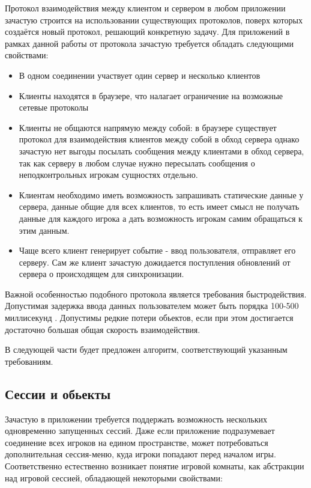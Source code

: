 \documentclass[a4paper,14pt, openany]{book}
\begin{document}
Протокол взаимодействия между клиентом и сервером в любом приложении зачастую строится на использовании существующих протоколов, поверх которых создаётся новый протокол, решающий конкретную задачу. Для приложений в рамках данной работы от протокола зачастую требуется обладать следующими свойствами:

\begin{itemize}
  \item В одном соединении участвует один сервер и несколько клиентов
  \item Клиенты находятся в браузере, что налагает ограничение на возможные сетевые протоколы
  \item Клиенты не общаются напрямую между собой: в браузере существует протокол для взаимодействия клиентов между собой в обход сервера \cite{webrtc} однако зачастую нет выгоды посылать сообщения между клиентами в обход сервера, так как серверу в любом случае нужно пересылать сообщения о неподконтрольных игрокам сущностях отдельно.
  \item Клиентам необходимо иметь возможность запрашивать статические данные у сервера, данные общие для всех клиентов, то есть имеет смысл не получать данные для каждого игрока а дать возможность игрокам самим обращаться к этим данным.
  \item Чаще всего клиент генерирует событие - ввод пользователя, отправляет его серверу. Сам же клиент зачастую дожидается поступления обновлений от сервера о происходящем для синхронизации.
\end{itemize}

Важной особенностью подобного протокола является требования быстродействия. Допустимая задержка ввода данных пользователем может быть порядка 100-500 миллисекунд \cite{latencyArticle}. Допустимы редкие потери обьектов, если при этом достигается достаточно большая общая скорость взаимодействия.

В следующей части будет предложен алгоритм, соответствующий указанным требованиям. 

\subsection{Сессии и обьекты}

Зачастую в приложении требуется поддержать возможность нескольких одновременно запущенных сессий. Даже если приложение подразумевает соединение всех игроков на едином пространстве, может потребоваться дополнительная сессия-меню, куда игроки попадают перед началом игры. Соответственно естественно возникает понятие игровой комнаты, как абстракции над игровой сессией, обладающей некоторыми свойствами:
\end{document}

